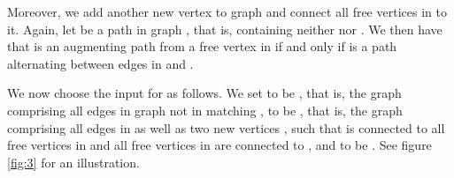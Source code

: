 \begin{isabellebody}
\begin{isamarkuptext}
Moreover, we add another new vertex  to graph  and connect all free vertices in
 to it. Again, let  be a path in graph , that is, containing neither
 nor . We then have that  is an augmenting path from a free vertex in
 if and only if  is a path alternating between edges in  and
.

We now choose the input for  as follows. We set  to be , that
is, the graph comprising all edges in graph  not in matching ,  to be
, that is, the graph comprising all edges in  as well as two new vertices
,  such that  is connected to all free vertices in  and all free
vertices in  are connected to , and  to be . See figure \ref{fig:3} for an illustration.%
\begin{figure}
    \centering
\end{figure}
\end{isamarkuptext}
\end{isabellebody}
